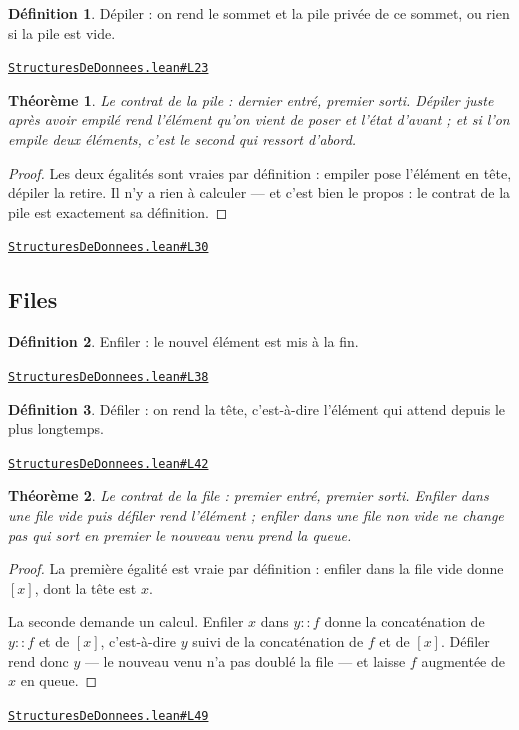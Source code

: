 \documentclass[11pt,a4paper]{article}
\theoremstyle{definition}
\newtheorem{definition}{Définition}
\theoremstyle{plain}
\newtheorem{theoreme}{Théorème}
\newcommand{\source}[2]{\par\smallskip\noindent\hfill{\footnotesize\href{#1}{\texttt{#2}}}\par\smallskip}
\begin{document}
\begin{definition}
Dépiler : on rend le sommet et la pile privée de ce sommet, ou rien si la pile est
vide.
\end{definition}
\source{https://github.com/Commutator-IO/learn-lean/blob/main/courses/02-lycee/11-informatique-nsi/StructuresDeDonnees.lean\#L23}{StructuresDeDonnees.lean\#L23}

\begin{theoreme}
Le contrat de la pile : dernier entré, premier sorti. Dépiler juste après avoir
empilé rend l'élément qu'on vient de poser et l'état d'avant ; et si l'on empile deux
éléments, c'est le second qui ressort d'abord.
\end{theoreme}
\begin{proof}
Les deux égalités sont vraies par définition : empiler pose l'élément en tête, dépiler
la retire. Il n'y a rien à calculer — et c'est bien le propos : le contrat de la pile
est exactement sa définition.
\end{proof}
\source{https://github.com/Commutator-IO/learn-lean/blob/main/courses/02-lycee/11-informatique-nsi/StructuresDeDonnees.lean\#L30}{StructuresDeDonnees.lean\#L30}

\subsection{Files}

\begin{definition}
Enfiler : le nouvel élément est mis à la fin.
\end{definition}
\source{https://github.com/Commutator-IO/learn-lean/blob/main/courses/02-lycee/11-informatique-nsi/StructuresDeDonnees.lean\#L38}{StructuresDeDonnees.lean\#L38}

\begin{definition}
Défiler : on rend la tête, c'est-à-dire l'élément qui attend depuis le plus
longtemps.
\end{definition}
\source{https://github.com/Commutator-IO/learn-lean/blob/main/courses/02-lycee/11-informatique-nsi/StructuresDeDonnees.lean\#L42}{StructuresDeDonnees.lean\#L42}

\begin{theoreme}
Le contrat de la file : premier entré, premier sorti. Enfiler dans une file vide
puis défiler rend l'élément ; enfiler dans une file non vide ne change pas qui sort en
premier \textemdash{} le nouveau venu prend la queue.
\end{theoreme}
\begin{proof}
La première égalité est vraie par définition : enfiler dans la file vide donne \([x]\),
dont la tête est \(x\).

La seconde demande un calcul. Enfiler \(x\) dans \(y :: f\) donne la concaténation de
\(y :: f\) et de \([x]\), c'est-à-dire \(y\) suivi de la concaténation de \(f\) et de
\([x]\). Défiler rend donc \(y\) — le nouveau venu n'a pas doublé la file — et laisse
\(f\) augmentée de \(x\) en queue.
\end{proof}
\source{https://github.com/Commutator-IO/learn-lean/blob/main/courses/02-lycee/11-informatique-nsi/StructuresDeDonnees.lean\#L49}{StructuresDeDonnees.lean\#L49}
\end{document}
